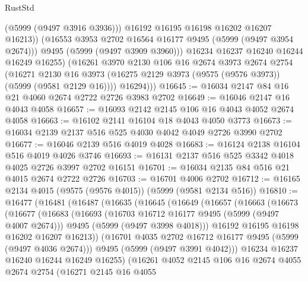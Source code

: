 \begin{lexlean}{RustStd}
\begin{coremodule}
                  (@5999 (@9497 @3916 @3936)))
                @16192
                @16195
                @16198
                @16202
                @16207
                @16213))
            (@16553 @3953 @2702 @16564 @16177 @9495 (@5999 (@9497 @3954 @2674)))
            @9495
            (@5999 (@9497 @3909 @3960)))
          @16234
          @16237
          @16240
          @16244
          @16249
          @16255)
        (@16261
          @3970
          @2130
          @106
          @16
          @2674
          @3973
          @2674
          @2754
          (@16271
            @2130
            @16
            @3973
            (@16275 @2129 @3973 (@9575 (@9576 @3973)) (@5999 (@9581 @2129 @16))))
          @16294)))
@16645 := @16034 @2147 @84 @16 @21 @4060 @2674 @2722 @2726 @3983 @2702
@16649 := @16046 @2147 @16 @4043 @4058
@16657 := @16093 @2142 @2145 @106 @16 @4043 @4052 @2674 @4058
@16663 := @16102 @2141 @16104 @18 @4043 @4050 @3773
@16673 := @16034 @2139 @2137 @516 @525 @4030 @4042 @4049 @2726 @3990 @2702
@16677 := @16046 @2139 @516 @4019 @4028
@16683 := @16124 @2138 @16104 @516 @4019 @4026 @3746
@16693 := @16131 @2137 @516 @525 @3342 @4018 @4025 @2726 @3997 @2702 @16151
@16701 := @16034 @2135 @84 @516 @21 @4015 @2674 @2722 @2726
@16703 := @16701 @4006 @2702
@16712 := @16165 @2134 @4015 (@9575 (@9576 @4015)) (@5999 (@9581 @2134 @516))
@16810 := @16477
    (@16481
      (@16487
        (@16635
          (@16645
            (@16649
              (@16657
                (@16663
                  (@16673
                    (@16677
                      (@16683
                        (@16693
                          (@16703 @16712 @16177 @9495 (@5999 (@9497 @4007 @2674)))
                          @9495
                          (@5999 (@9497 @3998 @4018)))
                        @16192
                        @16195
                        @16198
                        @16202
                        @16207
                        @16213))
                    (@16701 @4035 @2702 @16712 @16177 @9495 (@5999 (@9497 @4036 @2674)))
                    @9495
                    (@5999 (@9497 @3991 @4042)))
                  @16234
                  @16237
                  @16240
                  @16244
                  @16249
                  @16255)
                (@16261
                  @4052
                  @2145
                  @106
                  @16
                  @2674
                  @4055
                  @2674
                  @2754
                  (@16271
                    @2145
                    @16
                    @4055

\end{coremodule}
\end{lexlean}
